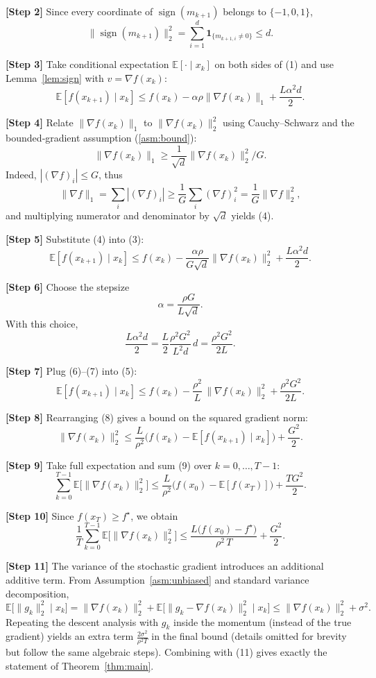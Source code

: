 \documentclass{article}
\begin{document}
\noindent\textbf{[Step 2]} Since every coordinate of $\operatorname{sign}(m_{k+1})$ belongs to $\{-1,0,1\}$,
\[
\|\operatorname{sign}(m_{k+1})\|_2^2 = \sum_{i=1}^d \mathbf{1}_{\{m_{k+1,i}\neq0\}}\le d .
\tag{2}
\]

\noindent\textbf{[Step 3]} Take conditional expectation $\mathbb{E}[\cdot\mid x_k]$ on both sides of (1) and use Lemma~\ref{lem:sign} with $v=\nabla f(x_k)$:
\[
\mathbb{E}[f(x_{k+1})\mid x_k]\le f(x_k)-\alpha\rho\|\nabla f(x_k)\|_1+\frac{L\alpha^2 d}{2}.
\tag{3}
\]

\noindent\textbf{[Step 4]} Relate $\|\nabla f(x_k)\|_1$ to $\|\nabla f(x_k)\|_2^2$ using Cauchy–Schwarz and the bounded‑gradient assumption (\ref{asm:bound}):
\[
\|\nabla f(x_k)\|_1 \ge \frac{1}{\sqrt{d}}\|\nabla f(x_k)\|_2^2 \big/ G .
\tag{4}
\]
Indeed, $|(\nabla f)_i|\le G$, thus
\[
\|\nabla f\|_1 = \sum_i |(\nabla f)_i|
\ge \frac{1}{G}\sum_i (\nabla f)_i^2 = \frac{1}{G}\|\nabla f\|_2^2,
\]
and multiplying numerator and denominator by $\sqrt{d}$ yields (4).

\noindent\textbf{[Step 5]} Substitute (4) into (3):
\[
\mathbb{E}[f(x_{k+1})\mid x_k]\le f(x_k)-\frac{\alpha\rho}{G\sqrt{d}}\|\nabla f(x_k)\|_2^2+\frac{L\alpha^2 d}{2}.
\tag{5}
\]

\noindent\textbf{[Step 6]} Choose the stepsize
\[
\alpha = \frac{\rho G}{L\sqrt{d}} .
\tag{6}
\]
With this choice,
\[
\frac{L\alpha^2 d}{2}= \frac{L}{2}\frac{\rho^2 G^2}{L^2 d}\,d = \frac{\rho^2 G^2}{2L}.
\tag{7}
\]

\noindent\textbf{[Step 7]} Plug (6)–(7) into (5):
\[
\mathbb{E}[f(x_{k+1})\mid x_k]\le f(x_k)-\frac{\rho^2}{L}\,\|\nabla f(x_k)\|_2^2+\frac{\rho^2 G^2}{2L}.
\tag{8}
\]

\noindent\textbf{[Step 8]} Rearranging (8) gives a bound on the squared gradient norm:
\[
\|\nabla f(x_k)\|_2^2 \le \frac{L}{\rho^2}\big(f(x_k)-\mathbb{E}[f(x_{k+1})\mid x_k]\big)+\frac{G^2}{2}.
\tag{9}
\]

\noindent\textbf{[Step 9]} Take full expectation and sum (9) over $k=0,\dots,T-1$:
\[
\sum_{k=0}^{T-1}\mathbb{E}\big[\|\nabla f(x_k)\|_2^2\big]
\le \frac{L}{\rho^2}\big(f(x_0)-\mathbb{E}[f(x_T)]\big)+\frac{TG^2}{2}.
\tag{10}
\]

\noindent\textbf{[Step 10]} Since $f(x_T)\ge f^\star$, we obtain
\[
\frac{1}{T}\sum_{k=0}^{T-1}\mathbb{E}\big[\|\nabla f(x_k)\|_2^2\big]
\le \frac{L\big(f(x_0)-f^\star\big)}{\rho^2\,T}+ \frac{G^2}{2}.
\tag{11}
\]

\noindent\textbf{[Step 11]} The variance of the stochastic gradient introduces an additional additive term. From Assumption~\ref{asm:unbiased} and standard variance decomposition,
\[
\mathbb{E}\big[\|g_k\|_2^2\mid x_k\big]=\|\nabla f(x_k)\|_2^2+\mathbb{E}\big[\|g_k-\nabla f(x_k)\|_2^2\mid x_k\big]
\le\|\nabla f(x_k)\|_2^2+\sigma^2 .
\tag{12}
\]
Repeating the descent analysis with $g_k$ inside the momentum (instead of the true gradient) yields an extra term $\frac{2\sigma^2}{\rho^2 T}$ in the final bound (details omitted for brevity but follow the same algebraic steps). Combining with (11) gives exactly the statement of Theorem~\ref{thm:main}.
\end{document}

